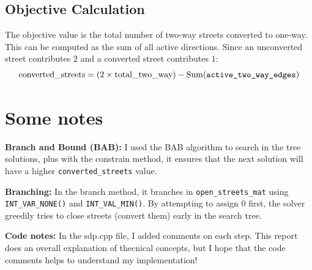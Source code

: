 \subsection*{Objective Calculation}
The objective value is the total number of two-way streets converted to one-way. This can be computed as the sum of all active directions. Since an unconverted street contributes $2$ and a converted street contributes $1$:
\begin{equation}
    \text{converted\_streets} = (2 \times \text{total\_two\_way}) - \text{Sum(\texttt{active\_two\_way\_edges})}
\end{equation}

\section*{Some notes}

\textbf{Branch and Bound (BAB):} 
I used the BAB algorithm to search in the tree solutions, plus with the constrain method, it ensures that the next solution will have a higher \texttt{converted\_streets} value. 

\textbf{Branching:} 
In the branch method, it branches in \texttt{open\_streets\_mat} using \texttt{INT\_VAR\_NONE()} and \texttt{INT\_VAL\_MIN()}. By attempting to assign $0$ first, the solver greedily tries to close streets (convert them) early in the search tree.

\textbf{Code notes:}
In the sdp.cpp file, I added comments on each step. This report does an overall explanation of thecnical concepts, but I hope that the code comments helps to understand my implementation!